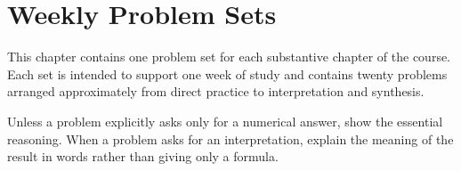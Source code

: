 \chapter{Weekly Problem Sets}

This chapter contains one problem set for each substantive chapter of the course. Each set is intended to support one week of study and contains twenty problems arranged approximately from direct practice to interpretation and synthesis.

Unless a problem explicitly asks only for a numerical answer, show the essential reasoning. When a problem asks for an interpretation, explain the meaning of the result in words rather than giving only a formula.













